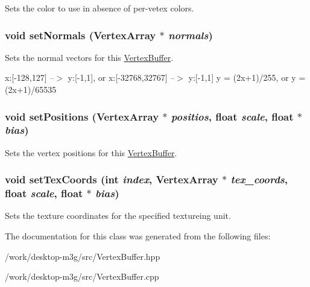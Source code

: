 Sets the color to use in absence of per-vetex colors. \hypertarget{classm3g_1_1VertexBuffer_4aabe6277538d5aa8285759dab85002a}{
\subsubsection[{setNormals}]{\setlength{\rightskip}{0pt plus 5cm}void setNormals ({\bf VertexArray} $\ast$ {\em normals})}}
\label{classm3g_1_1VertexBuffer_4aabe6277538d5aa8285759dab85002a}


Sets the normal vectors for this \hyperlink{classm3g_1_1VertexBuffer}{VertexBuffer}.

x:\mbox{[}-128,127\mbox{]} --$>$ y:\mbox{[}-1,1\mbox{]}, or x:\mbox{[}-32768,32767\mbox{]} --$>$ y:\mbox{[}-1,1\mbox{]} y = (2x+1)/255, or y = (2x+1)/65535 \hypertarget{classm3g_1_1VertexBuffer_527460407f488d5128bae7d0adb6da43}{
\subsubsection[{setPositions}]{\setlength{\rightskip}{0pt plus 5cm}void setPositions ({\bf VertexArray} $\ast$ {\em positios}, \/  float {\em scale}, \/  float $\ast$ {\em bias})}}
\label{classm3g_1_1VertexBuffer_527460407f488d5128bae7d0adb6da43}


Sets the vertex positions for this \hyperlink{classm3g_1_1VertexBuffer}{VertexBuffer}. \hypertarget{classm3g_1_1VertexBuffer_9fd3dd3f78138d654d18863e4f1329f4}{
\subsubsection[{setTexCoords}]{\setlength{\rightskip}{0pt plus 5cm}void setTexCoords (int {\em index}, \/  {\bf VertexArray} $\ast$ {\em tex\_\-coords}, \/  float {\em scale}, \/  float $\ast$ {\em bias})}}
\label{classm3g_1_1VertexBuffer_9fd3dd3f78138d654d18863e4f1329f4}


Sets the texture coordinates for the specified textureing unit. 

The documentation for this class was generated from the following files:\begin{CompactItemize}
\item 
/work/desktop-m3g/src/VertexBuffer.hpp\item 
/work/desktop-m3g/src/VertexBuffer.cpp\end{CompactItemize}
